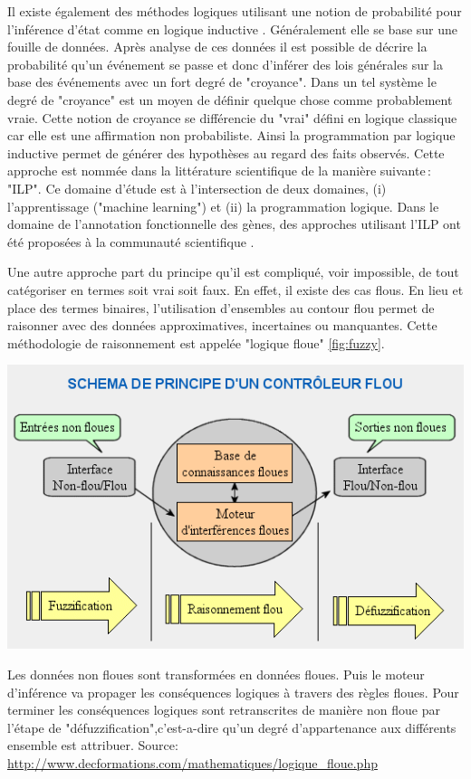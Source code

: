 \begin{refsegment}
    Il existe également des méthodes logiques utilisant une notion de probabilité pour l'inférence d'état comme en logique inductive \cite{michalski1983theory,muggleton1994inductive}. Généralement elle se base sur une fouille de données. Après analyse de ces données il est possible de décrire la probabilité qu'un événement se passe et donc d'inférer des lois générales sur la base des événements avec un fort degré de "croyance". Dans un tel système le degré de "croyance" est un moyen de définir quelque chose comme probablement vraie. Cette notion de croyance se différencie du "vrai" défini en logique classique car elle est une affirmation non probabiliste. Ainsi la programmation par logique inductive permet de générer des hypothèses au regard des faits observés. Cette approche est nommée dans la littérature scientifique de la manière suivante : "\gls{ILP}". Ce domaine d'étude est à l'intersection de deux domaines, (i) l'apprentissage ("machine learning") et (ii) la programmation logique. Dans le domaine de l'annotation fonctionnelle des gènes, des approches utilisant l'\gls{ILP} ont été proposées à la communauté scientifique \cite{clare2003predicting,king2004applying}.
    
    Une autre approche part du principe qu'il est compliqué, voir impossible, de tout catégoriser en termes soit vrai soit faux. En effet, il existe des cas flous. En lieu et place des termes binaires, l'utilisation d'ensembles au contour flou permet de raisonner avec des données approximatives, incertaines ou manquantes. Cette méthodologie de raisonnement est appelée "logique floue" \ref{fig:fuzzy}.
        
    \begin{shadedfigure}[H]
        \centering
        \includegraphics[width=\textwidth]{img/fuzzi-schema-controleur.png}
        \caption{Les données non floues sont transformées en données floues. Puis le moteur d'inférence va propager les conséquences logiques à travers des règles floues. Pour terminer les conséquences logiques sont retranscrites de  manière non floue par l'étape de "défuzzification",c'est-a-dire qu'un degré d'appartenance aux différents ensemble est attribuer. \hspace{\textwidth}\tiny{Source: \url{http://www.decformations.com/mathematiques/logique_floue.php}}}
        \label{fig:fuzzy}
    \end{shadedfigure}
    
    
    \subbibliography
\end{refsegment}